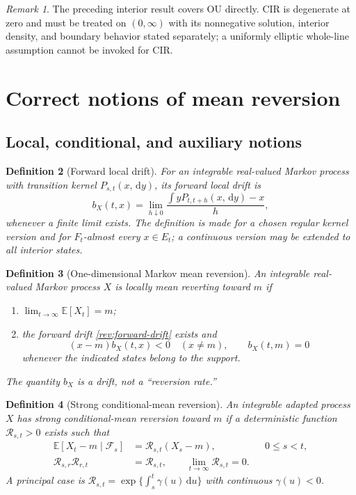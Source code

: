 \documentclass[11pt]{article}
\newtheorem{definition}{Definition}[section]
\theoremstyle{remark}
\newtheorem{remark}[definition]{Remark}
\newcommand{\E}{\mathbb E}
\newcommand{\dd}{\,\mathrm d}
\begin{document}
\begin{remark}
The preceding interior result covers OU directly.  CIR is degenerate at zero
and must be treated on $(0,\infty)$ with its nonnegative solution, interior
density, and boundary behavior stated separately; a uniformly elliptic
whole-line assumption cannot be invoked for CIR.
\end{remark}

\section{Correct notions of mean reversion}

\subsection{Local, conditional, and auxiliary notions}

\begin{definition}[Forward local drift]
\label{rev:def-forward-drift}
For an integrable real-valued Markov process with transition kernel
$P_{s,t}(x,\dd y)$, its forward local drift is
\begin{equation}
b_X(t,x)=\lim_{h\downarrow0}
\frac{\int yP_{t,t+h}(x,\dd y)-x}{h},
\label{rev:forward-drift}
\end{equation}
whenever a finite limit exists.  The definition is made for a chosen regular
kernel version and for $F_t$-almost every $x\in E_t$; a continuous version may
be extended to all interior states.
\end{definition}

\begin{definition}[One-dimensional Markov mean reversion]
\label{rev:def-local-mr}
An integrable real-valued Markov process $X$ is \emph{locally mean reverting
toward $m$} if
\begin{enumerate}[label=(\roman*)]
\item $\lim_{t\to\infty}\E[X_t]=m$;
\item the forward drift \eqref{rev:forward-drift} exists and
\begin{equation}
(x-m)b_X(t,x)<0\quad(x\ne m),
\qquad b_X(t,m)=0
\label{rev:local-sign}
\end{equation}
whenever the indicated states belong to the support.
\end{enumerate}
The quantity $b_X$ is a drift, not a ``reversion rate.''
\end{definition}

\begin{definition}[Strong conditional-mean reversion]
\label{rev:def-strong-mr}
An integrable adapted process $X$ has \emph{strong conditional-mean reversion}
toward $m$ if a deterministic function $\mathcal R_{s,t}>0$ exists such that
\begin{align}
\E[X_t-m\mid\mathcal F_s]&=\mathcal R_{s,t}(X_s-m),
      &&0\le s<t,\label{rev:strong-mr}\\
\mathcal R_{s,r}\mathcal R_{r,t}&=\mathcal R_{s,t},\qquad
\lim_{t\to\infty}\mathcal R_{s,t}=0.\label{rev:R-properties}
\end{align}
A principal case is
$\mathcal R_{s,t}=\exp\{\int_s^t\gamma(u)\dd u\}$ with continuous
$\gamma(u)<0$.
\end{definition}
\end{document}

